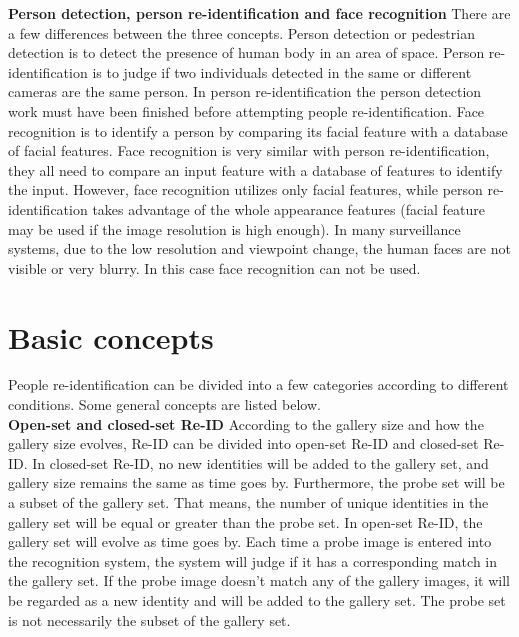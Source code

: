 \textbf{Person detection, person re-identification and face recognition} There are a few differences between the three concepts. Person detection or pedestrian detection is to detect the presence of human body in an area of space. Person re-identification is to judge if two individuals detected in the same or different cameras are the same person. In person re-identification the person detection work must have been finished before attempting people re-identification. Face recognition is to identify a person by comparing its facial feature with a database of facial features. Face recognition is very similar with person re-identification, they all need to compare an input feature with a database of features to identify the input. However, face recognition utilizes only facial features, while person re-identification takes advantage of the whole appearance features (facial feature may be used if the image resolution is high enough). In many surveillance systems, due to the low resolution and viewpoint change, the human faces are not visible or very blurry. In this case face recognition can not be used. 


	
\section{Basic concepts}
People re-identification can be divided into a few categories according to different conditions. Some general concepts are listed below.\\
\indent \textbf{Open-set and closed-set Re-ID} \cite{REIDsurvey} According to the gallery size and how the gallery size evolves, Re-ID can be divided into open-set Re-ID and closed-set Re-ID. In closed-set Re-ID, no new identities will be added to the gallery set, and gallery size remains the same as time goes by. Furthermore, the probe set will be a subset of the gallery set. That means, the number of unique identities in the gallery set will be equal or greater than the probe set. In open-set Re-ID, the gallery set will evolve as time goes by. Each time a probe image is entered into the recognition system, the system will judge if it has a corresponding match in the gallery set. If the probe image doesn't match any of the gallery images, it will be regarded as a new identity and will be added to the gallery set. The probe set is not necessarily the subset of the gallery set. 

